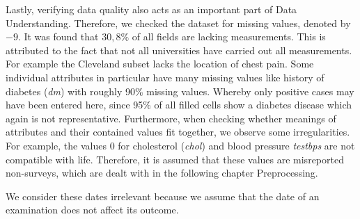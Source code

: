 Lastly, verifying data quality also acts as an important part of Data Understanding. Therefore, we checked the dataset for missing values, denoted by $-9$. It was found that $30,8\%$ of all fields are lacking measurements. This is attributed to the fact that not all universities have carried out all measurements.  For example the Cleveland subset lacks the location of chest pain. Some individual attributes in particular have many missing values like history of diabetes (\textit{dm}) with roughly 90\% missing values. Whereby only positive cases may have been entered here, since 95\% of all filled cells show a diabetes disease which again is not representative. Furthermore, when checking whether meanings of attributes and their contained values fit together, we observe some irregularities. For example, the values 0 for cholesterol (\textit{chol}) and blood pressure \textit{testbps} are not compatible with life. Therefore, it is assumed that these values are misreported non-surveys, which are dealt with in the following chapter Preprocessing. 


We consider these dates irrelevant because we assume that the date of  an examination does not affect its outcome. 